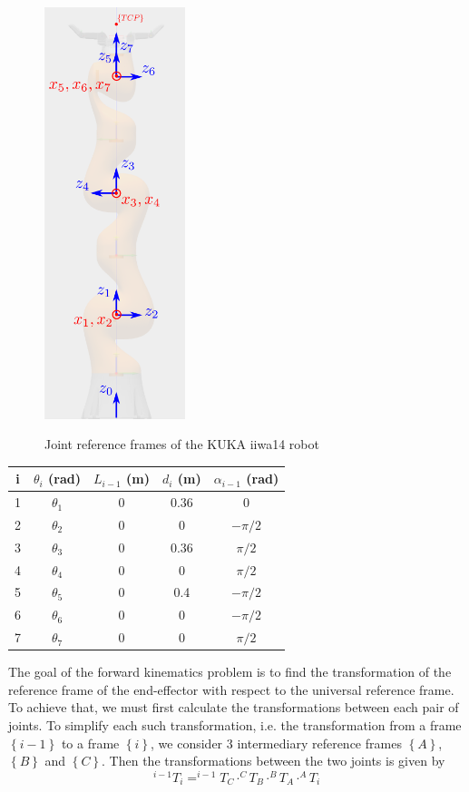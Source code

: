 \begin{center}
\begin{figure}[!htb]
\centering
\includegraphics[height=12cm]{images/iiwa-frames.png}\\
\caption{Joint reference frames of the KUKA iiwa14 robot}
\end{figure}
\end{center}

\begin{center}
\begin{tabular}{ |c|c|c|c|c| } 
\hline
i & $θ_i$ (rad) & $L_{i-1}$ (m) & $d_i$ (m) & $α_{i-1}$ (rad) \\
\hline
1 & $θ_1$ & 0 & 0.36 & 0 \\
2 & $θ_2$ & 0 & 0 & $-π/2$ \\
3 & $θ_3$ & 0 & 0.36 & $π/2$ \\
4 & $θ_4$ & 0 & 0 & $π/2$\\
5 & $θ_5$ & 0 & 0.4 & $-π/2$ \\
6 & $θ_6$ & 0 & 0 & $-π/2$ \\
7 & $θ_7$ & 0 & 0 & $π/2$ \\
\hline
\end{tabular}
\end{center}

The goal of the forward kinematics problem is to find the transformation of the reference frame of the end-effector with respect to the universal reference frame. To achieve that, we must first calculate the 
transformations between each pair of joints. To simplify each such transformation, i.e. the transformation from a frame $\left\lbrace i-1 \right\rbrace$ to a frame $\left\lbrace i \right\rbrace$, we 
consider 3 intermediary reference frames $\left\lbrace A \right\rbrace$, $\left\lbrace B \right\rbrace$ and $\left\lbrace C \right\rbrace$. Then the transformations between the two joints is given by
\begin{equation}
^{i-1}T_i = ^{i-1}T_C \cdot ^{C}T_B \cdot ^{B}T_A \cdot ^{A}T_i
\end{equation}

